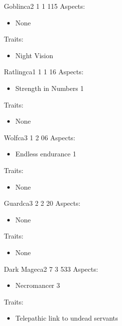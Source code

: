 \documentclass[11pt]{article}
\begin{document}
{\begin{npc}{Goblin}{ca}{2 1 1 1}{15}
Aspects:
\begin{itemize}
\item None
\end{itemize}
Traits:
\begin{itemize}
\item Night Vision
\end{itemize}
\end{npc}

\begin{npc}{Ratling}{ca}{1 1 1 1}{6}
Aspects:
\begin{itemize}
\item Strength in Numbers 1
\end{itemize}
Traits:
\begin{itemize}
\item None
\end{itemize}
\end{npc}

\begin{npc}{Wolf}{ca}{3 1 2 0}{6}
Aspects:
\begin{itemize}
\item Endless endurance 1
\end{itemize}
Traits:
\begin{itemize}
\item None
\end{itemize}
\end{npc}

\begin{npc}{Guard}{ca}{3 2 2 2}{0}
Aspects:
\begin{itemize}
\item None
\end{itemize}
Traits:
\begin{itemize}
\item None
\end{itemize}
\end{npc}

\begin{npc}{Dark Mage}{ca}{2 7 3 5}{33}
Aspects:
\begin{itemize}
\item Necromancer 3
\end{itemize}
\columnbreak
Traits:
\begin{itemize}
\item Telepathic link to undead servants
\end{itemize}
\end{npc}

}
\end{document}
